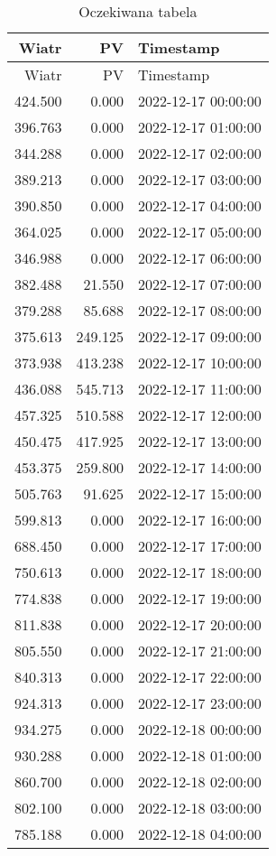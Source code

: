 \documentclass[
]{article}
\begin{document}
\begin{longtable}[]{@{}rrl@{}}
\caption{Oczekiwana tabela}\tabularnewline
\toprule()
Wiatr & PV & Timestamp \\
\midrule()
\endfirsthead
\toprule()
Wiatr & PV & Timestamp \\
\midrule()
\endhead
424.500 & 0.000 & 2022-12-17 00:00:00 \\
396.763 & 0.000 & 2022-12-17 01:00:00 \\
344.288 & 0.000 & 2022-12-17 02:00:00 \\
389.213 & 0.000 & 2022-12-17 03:00:00 \\
390.850 & 0.000 & 2022-12-17 04:00:00 \\
364.025 & 0.000 & 2022-12-17 05:00:00 \\
346.988 & 0.000 & 2022-12-17 06:00:00 \\
382.488 & 21.550 & 2022-12-17 07:00:00 \\
379.288 & 85.688 & 2022-12-17 08:00:00 \\
375.613 & 249.125 & 2022-12-17 09:00:00 \\
373.938 & 413.238 & 2022-12-17 10:00:00 \\
436.088 & 545.713 & 2022-12-17 11:00:00 \\
457.325 & 510.588 & 2022-12-17 12:00:00 \\
450.475 & 417.925 & 2022-12-17 13:00:00 \\
453.375 & 259.800 & 2022-12-17 14:00:00 \\
505.763 & 91.625 & 2022-12-17 15:00:00 \\
599.813 & 0.000 & 2022-12-17 16:00:00 \\
688.450 & 0.000 & 2022-12-17 17:00:00 \\
750.613 & 0.000 & 2022-12-17 18:00:00 \\
774.838 & 0.000 & 2022-12-17 19:00:00 \\
811.838 & 0.000 & 2022-12-17 20:00:00 \\
805.550 & 0.000 & 2022-12-17 21:00:00 \\
840.313 & 0.000 & 2022-12-17 22:00:00 \\
924.313 & 0.000 & 2022-12-17 23:00:00 \\
934.275 & 0.000 & 2022-12-18 00:00:00 \\
930.288 & 0.000 & 2022-12-18 01:00:00 \\
860.700 & 0.000 & 2022-12-18 02:00:00 \\
802.100 & 0.000 & 2022-12-18 03:00:00 \\
785.188 & 0.000 & 2022-12-18 04:00:00 \\

\end{longtable}
\end{document}
